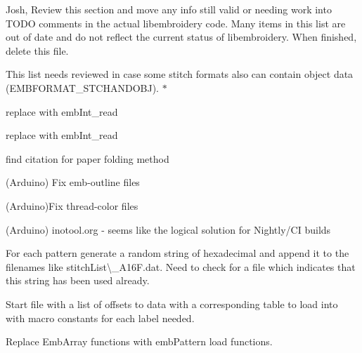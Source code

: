 \begin{DoxyRefList}
\label{todo__todo000192}%
%
Josh, Review this section and move any info still valid or needing work into TODO comments in the actual libembroidery code. Many items in this list are out of date and do not reflect the current status of libembroidery. When finished, delete this file. 
\item[Member \mbox{\hyperlink{formats_8c_a8cb11404ce46501561f956d33f8dcf95}{format\+Table}} \mbox{[}number\+Of\+Formats\mbox{]}]\label{todo__todo000217}%
%
This list needs reviewed in case some stitch formats also can contain object data (EMBFORMAT\+\_\+\+STCHANDOBJ). $\ast$  
\item[Member \mbox{\hyperlink{formats_8c_a05fb50e7292226bc2947dd2b4da7a9bd}{fread\+\_\+int32\+\_\+be}} (FILE $\ast$f)]\label{todo__todo000219}%
%
replace with emb\+Int\+\_\+read  
\item[Member \mbox{\hyperlink{formats_8c_a2bcdb1e6bf6930d5c054ecdca9831eba}{fread\+\_\+uint16}} (FILE $\ast$f)]\label{todo__todo000218}%
%
replace with emb\+Int\+\_\+read  
\item[Member \mbox{\hyperlink{fill_8c_ad02b5d945eacff708d2bf084c40044d8}{generate\+\_\+dragon\+\_\+curve}} (char $\ast$state, int iterations)]\label{todo__todo000212}%
%
find citation for paper folding method  
\item[Page \mbox{\hyperlink{geometry-and-algorithms}{Geometry and Algorithms}} ]\label{todo__todo000194}%
%
(Arduino) Fix emb-\/outline files

\label{todo__todo000195}%
%
(Arduino)Fix thread-\/color files

\label{todo__todo000197}%
%
(Arduino) inotool.\+org -\/ seems like the logical solution for Nightly/\+CI builds

\label{todo__todo000203}%
%
For each pattern generate a random string of hexadecimal and append it to the filenames like {\ttfamily stitch\+List\textbackslash{}\+\_\+\+A16\+F.\+dat}. Need to check for a file which indicates that this string has been used already.

\label{todo__todo000202}%
%
Start file with a list of offsets to data with a corresponding table to load into with macro constants for each label needed.

\label{todo__todo000201}%
%
Replace Emb\+Array functions with emb\+Pattern load functions.


\end{DoxyRefList}
